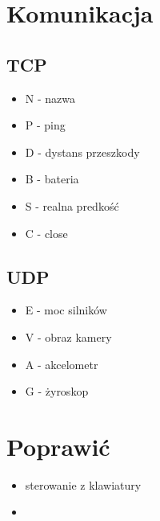 \documentclass[12pt,a4paper,polish]{article}
\begin{document}
  \section{Komunikacja}

    \subsection{TCP}
      \begin{itemize}
        \item N - nazwa
        \item P - ping
        \item D - dystans przeszkody
        \item B - bateria
        \item S - realna predkość
        \item C - close
      \end{itemize}

    \subsection{UDP}
    \begin{itemize}
      \item E - moc silników
      \item V - obraz kamery
      \item A - akcelometr
      \item G - żyroskop
    \end{itemize}

    \section{Poprawić}
    \begin{itemize}
      \item sterowanie z klawiatury
      \item 
    \end{itemize}

\end{document}
